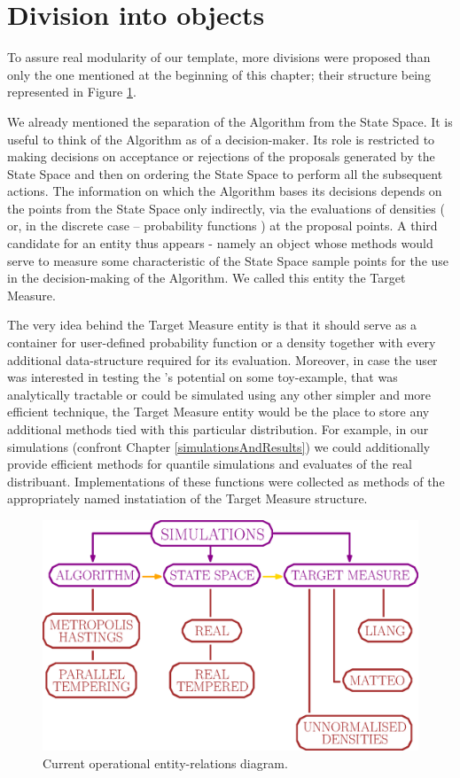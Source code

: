 \section{Division into objects}

To assure real modularity of our template, more divisions were proposed than only the one mentioned at the beginning of this chapter; their structure being represented in Figure \ref{objectStructure}.

We already mentioned the separation of the Algorithm from the State Space. It is useful to think of the Algorithm as of a decision-maker. Its role is restricted to making decisions on acceptance or rejections of the proposals generated by the State Space and then on ordering the State Space to perform all the subsequent actions. The information on which the Algorithm bases its decisions depends on the points from the State Space only indirectly, via the evaluations of densities ( or, in the discrete case -- probability functions ) at the proposal points. A third candidate for an entity thus appears - namely an object whose methods would serve to measure some characteristic of the State Space sample points for the use in the decision-making of the Algorithm. We called this entity the Target Measure. 

The very idea behind the Target Measure entity is that it should serve as a container for user-defined probability function or a density together with every additional data-structure required for its evaluation. Moreover, in case the user was interested in testing the \PT's potential on some toy-example, that was analytically tractable or could be simulated using any other simpler and more efficient technique, the Target Measure entity would be the place to store any additional methods tied with this particular distribution. For example, in our simulations (confront Chapter \ref{simulationsAndResults}) we could  additionally provide efficient methods for quantile simulations and evaluates of the real distribuant. Implementations of these functions were collected as methods of the appropriately named instatiation of the Target Measure structure.  

\begin{figure}
	\centering \includegraphics[keepaspectratio=true, width =\linewidth]{./img/objectStructure.eps}
	\caption{Current operational entity-relations diagram.}\label{objectStructure}
\end{figure}

